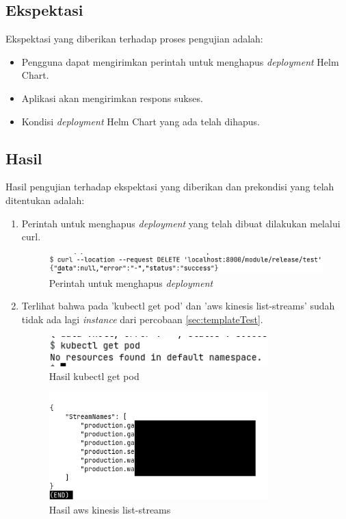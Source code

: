 \subsection{Ekspektasi}
Ekspektasi yang diberikan terhadap proses pengujian adalah:
\begin{itemize}
    \item Pengguna dapat mengirimkan perintah untuk menghapus \textit{deployment} Helm Chart.
    \item Aplikasi akan mengirimkan respons sukses.
    \item Kondisi \textit{deployment} Helm Chart yang ada telah dihapus.
\end{itemize}
\subsection{Hasil}
Hasil pengujian terhadap ekspektasi yang diberikan dan prekondisi yang telah ditentukan adalah:
\begin{enumerate}
    \item Perintah untuk menghapus \textit{deployment} yang telah dibuat dilakukan melalui curl.
    \begin{figure}
    	\centering
    	\includegraphics[width=1\textwidth]{pics/5.8.curl.png}
    	\caption{Perintah untuk menghapus \textit{deployment}}
    	\label{fig:deleteDeployment}
    \end{figure}
    \item Terlihat bahwa pada 'kubectl get pod' dan 'aws kinesis list-streams' sudah tidak ada lagi \textit{instance} dari percobaan \ref{sec:templateTest}.
    \begin{figure}
    	\centering
    	\includegraphics[width=0.8\textwidth]{pics/5.8.getPod.png}
    	\caption{Hasil kubectl get pod}
    	\label{fig:getPodDeleted}
    \end{figure}
    \begin{figure}
    	\centering
    	\includegraphics[width=0.8\textwidth]{pics/5.8.listStreams.png}
    	\caption{Hasil aws kinesis list-streams}
    	\label{fig:listStreamDeleted}
    \end{figure}
    
\end{enumerate}


